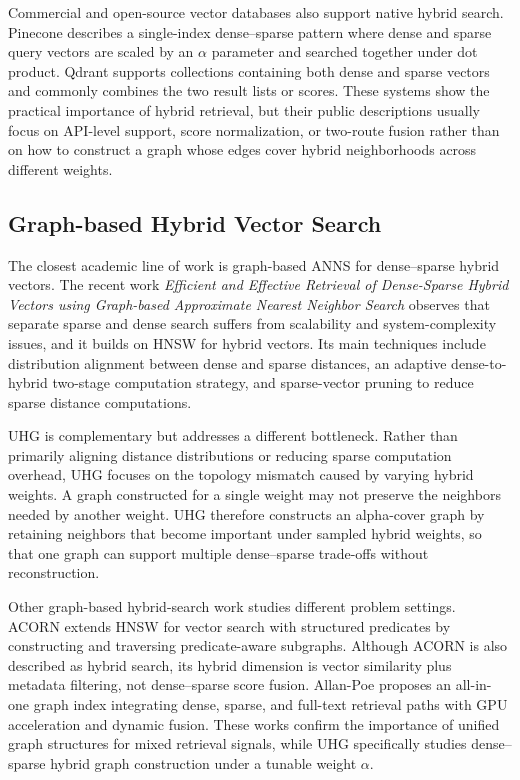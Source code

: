 Commercial and open-source vector databases also support native hybrid search. Pinecone describes a single-index dense--sparse pattern where dense and sparse query vectors are scaled by an $\alpha$ parameter and searched together under dot product. Qdrant supports collections containing both dense and sparse vectors and commonly combines the two result lists or scores. These systems show the practical importance of hybrid retrieval, but their public descriptions usually focus on API-level support, score normalization, or two-route fusion rather than on how to construct a graph whose edges cover hybrid neighborhoods across different weights.

\subsection{Graph-based Hybrid Vector Search}

The closest academic line of work is graph-based ANNS for dense--sparse hybrid vectors. The recent work \emph{Efficient and Effective Retrieval of Dense-Sparse Hybrid Vectors using Graph-based Approximate Nearest Neighbor Search} observes that separate sparse and dense search suffers from scalability and system-complexity issues, and it builds on HNSW for hybrid vectors. Its main techniques include distribution alignment between dense and sparse distances, an adaptive dense-to-hybrid two-stage computation strategy, and sparse-vector pruning to reduce sparse distance computations.

UHG is complementary but addresses a different bottleneck. Rather than primarily aligning distance distributions or reducing sparse computation overhead, UHG focuses on the topology mismatch caused by varying hybrid weights. A graph constructed for a single weight may not preserve the neighbors needed by another weight. UHG therefore constructs an alpha-cover graph by retaining neighbors that become important under sampled hybrid weights, so that one graph can support multiple dense--sparse trade-offs without reconstruction.

Other graph-based hybrid-search work studies different problem settings. ACORN extends HNSW for vector search with structured predicates by constructing and traversing predicate-aware subgraphs. Although ACORN is also described as hybrid search, its hybrid dimension is vector similarity plus metadata filtering, not dense--sparse score fusion. Allan-Poe proposes an all-in-one graph index integrating dense, sparse, and full-text retrieval paths with GPU acceleration and dynamic fusion. These works confirm the importance of unified graph structures for mixed retrieval signals, while UHG specifically studies dense--sparse hybrid graph construction under a tunable weight $\alpha$.

